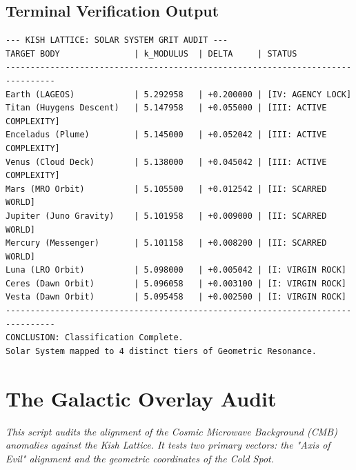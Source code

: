 \documentclass[11pt, letterpaper, openany]{book}
\begin{document}
\section*{Terminal Verification Output}
\begin{lstlisting}[style=terminal, caption={Execution Log: Solar Grit Analysis}]
--- KISH LATTICE: SOLAR SYSTEM GRIT AUDIT ---
TARGET BODY               | k_MODULUS  | DELTA     | STATUS
--------------------------------------------------------------------------------
Earth (LAGEOS)            | 5.292958   | +0.200000 | [IV: AGENCY LOCK]
Titan (Huygens Descent)   | 5.147958   | +0.055000 | [III: ACTIVE COMPLEXITY]
Enceladus (Plume)         | 5.145000   | +0.052042 | [III: ACTIVE COMPLEXITY]
Venus (Cloud Deck)        | 5.138000   | +0.045042 | [III: ACTIVE COMPLEXITY]
Mars (MRO Orbit)          | 5.105500   | +0.012542 | [II: SCARRED WORLD]
Jupiter (Juno Gravity)    | 5.101958   | +0.009000 | [II: SCARRED WORLD]
Mercury (Messenger)       | 5.101158   | +0.008200 | [II: SCARRED WORLD]
Luna (LRO Orbit)          | 5.098000   | +0.005042 | [I: VIRGIN ROCK]
Ceres (Dawn Orbit)        | 5.096058   | +0.003100 | [I: VIRGIN ROCK]
Vesta (Dawn Orbit)        | 5.095458   | +0.002500 | [I: VIRGIN ROCK]
--------------------------------------------------------------------------------
CONCLUSION: Classification Complete.
Solar System mapped to 4 distinct tiers of Geometric Resonance.
\end{lstlisting}


\chapter{The Galactic Overlay Audit}
\label{app:galactic_overlay}
\textit{This script audits the alignment of the Cosmic Microwave Background (CMB) anomalies against the Kish Lattice. It tests two primary vectors: the "Axis of Evil" alignment and the geometric coordinates of the Cold Spot.}
\end{document}
